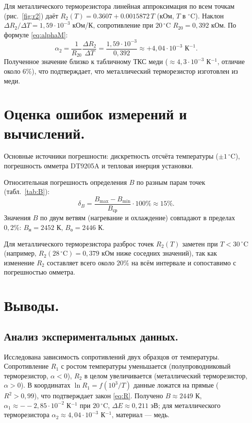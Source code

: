 \documentclass[12pt, a4paper]{article}
\begin{document}
	Для металлического терморезистора линейная аппроксимация по всем точкам (рис.~\ref{fig:r2}) даёт $R_2(T) = 0.3607 + 0.0015872\,T$ (кОм, $T$ в $^\circ$C). Наклон $\Delta R_2/\Delta T = 1,59 \cdot 10^{-3}$ кОм/К, сопротивление при $20\,^\circ$C $R_{20} = 0,392$ кОм. По формуле \eqref{eq:alphaM}:
	\[
	\alpha_2 = \frac{1}{R_{20}}\frac{\Delta R_2}{\Delta T} = \frac{1,59 \cdot 10^{-3}}{0,392} \approx +4,04 \cdot 10^{-3} \text{ К}^{-1}.
	\]
	Полученное значение близко к табличному ТКС меди ($\approx 4{,}3 \cdot 10^{-3}$ К$^{-1}$, отличие около 6\%), что подтверждает, что металлический терморезистор изготовлен из меди.
	
	\section{Оценка ошибок измерений и вычислений.}
	Основные источники погрешности: дискретность отсчёта температуры ($\pm 1\,^\circ$C), погрешность омметра DT9205A и тепловая инерция установки.
	
	Относительная погрешность определения $B$ по разным парам точек (табл.~\ref{tab:B}):
	\[
	\delta_B = \frac{B_{\max} - B_{\min}}{B_{\text{ср}}} \cdot 100\% \approx 15\%.
	\]
	Значения $B$ по двум ветвям (нагревание и охлаждение) совпадают в пределах $0{,}2\%$: $B_{\text{н}} = 2452$ К, $B_{\text{о}} = 2446$ К.
	
	Для металлического терморезистора разброс точек $R_2(T)$ заметен при $T < 30\,^\circ$C (например, $R_2(28\,^\circ\text{C}) = 0{,}379$ кОм ниже соседних значений), так как изменение $R_2$ составляет всего около $20\%$ на всём интервале и сопоставимо с погрешностью омметра.
	
	\section{Выводы.}
	\subsection*{Анализ экспериментальных данных.}
	Исследована зависимость сопротивлений двух образцов от температуры. Сопротивление $R_1$ с ростом температуры уменьшается (полупроводниковый терморезистор, $\alpha < 0$), $R_2$ в целом увеличивается (металлический терморезистор, $\alpha > 0$). В координатах $\ln R_1 = f(10^3/T)$ данные ложатся на прямые ($R^2 > 0{,}99$), что подтверждает закон \eqref{eq:R}. Получено $B \approx 2449$ К, $\alpha_1 \approx --2,85 \cdot 10^{-2}$ К$^{-1}$ при $20\,^\circ$C, $\Delta E \approx 0,211$ эВ; для металлического терморезистора $\alpha_2 \approx 4,04 \cdot 10^{-3}$ К$^{-1}$, материал --- медь.
	
\end{document}
